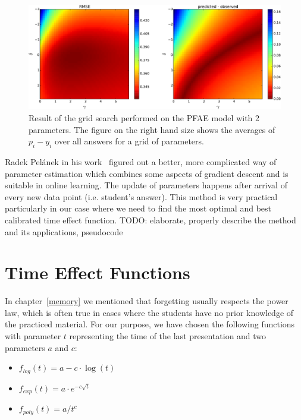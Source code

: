 \begin{figure}[htbp]
  \centering
  \includegraphics[width=\textwidth]{img/pfa-grid-search-rmse-off}
  \caption{Result of the grid search performed on the PFAE model with 2 parameters. The figure on the right hand size shows the averages of $p_i - y_i$ over all answers for a grid of parameters.}
  \label{fig-grid-search-rmse-off}
\end{figure}

Radek Pelánek in his work~\cite{Pelanek2015} figured out a better, more complicated way of parameter estimation which combines some aspects of gradient descent and is suitable in online learning. The update of parameters happens after arrival of every new data point (i.e. student's answer). This method is very practical particularly in our case where we need to find the most optimal and best calibrated time effect function. TODO: elaborate, properly describe the method and its applications, pseudocode

\section{Time Effect Functions}
\label{time-effect-functions}

In chapter~\ref{memory} we mentioned that forgetting usually respects the power law, which is often true in cases where the students have no prior knowledge of the practiced material. For our purpose, we have chosen the following functions with parameter $t$ representing the time of the last presentation and two parameters $a$ and $c$:

\begin{itemize}
  \item $f_{\mathit{log}}(t) = a - c \cdot \log(t)$
  \item $f_{\mathit{exp}}(t) = a \cdot e^{-c \sqrt{t}}$
  \item $f_{\mathit{poly}}(t) = a / t^c$
\end{itemize}

